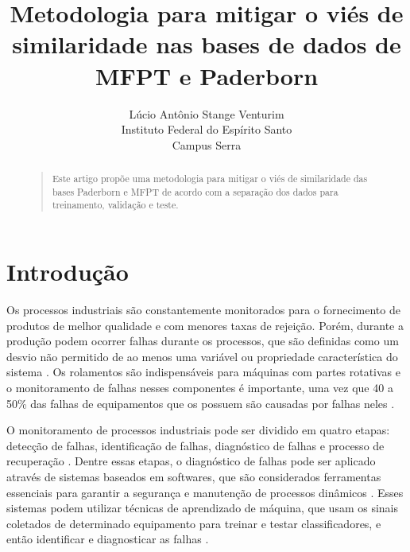 \documentclass[letterpaper]{article}
\begin{document}
%
\title{Metodologia para mitigar o viés de similaridade nas bases de dados de MFPT e Paderborn}
\author{Lúcio Antônio Stange Venturim\\
Instituto Federal do Espírito Santo\\
Campus Serra\\
}
\maketitle
\begin{abstract}
\begin{quote}
Este artigo propõe uma metodologia para mitigar o viés de similaridade das bases Paderborn e MFPT de acordo com a separação dos dados para treinamento, validação e teste.
\end{quote}
\end{abstract}

\section{Introdução}

Os processos industriais são constantemente monitorados para o fornecimento de produtos de melhor qualidade e com menores taxas de rejeição. Porém, durante a produção podem ocorrer falhas durante os processos, que são definidas como um desvio não permitido de ao menos uma variável ou propriedade característica do sistema \cite{isermann1997trends}. Os rolamentos são indispensáveis para máquinas com partes rotativas e o monitoramento de falhas nesses componentes é importante, uma vez que 40 a 50\% das falhas de equipamentos que os possuem são causadas por falhas neles \cite{nandi2005condition}.

O monitoramento de processos industriais pode ser dividido em quatro etapas: detecção de falhas, identificação de falhas, diagnóstico de falhas e processo de recuperação \cite{chiang2000fault}. Dentre essas etapas, o diagnóstico de falhas pode ser aplicado através de sistemas baseados em softwares, que são considerados ferramentas essenciais para garantir a segurança e manutenção de processos dinâmicos \cite{chiang2000fault}. Esses sistemas podem utilizar técnicas de aprendizado de máquina, que usam os sinais coletados de determinado equipamento para treinar e testar classificadores, e então identificar e diagnosticar as falhas \cite{rauber2020experimental}.
\end{document}
